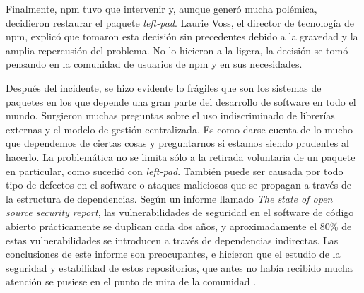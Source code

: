 Finalmente, npm tuvo que intervenir y, aunque generó mucha polémica, decidieron restaurar el paquete \textit{left-pad}. Laurie Voss, 
el director de tecnología de npm, explicó que tomaron esta decisión sin precedentes debido a la gravedad y la amplia repercusión del 
problema. No lo hicieron a la ligera, la decisión se tomó pensando en la comunidad de usuarios de npm y en sus necesidades.


Después del incidente, se hizo evidente lo frágiles que son los sistemas de paquetes en los que depende una gran parte del desarrollo
de software en todo el mundo.
Surgieron muchas preguntas sobre el uso indiscriminado de librerías externas \cite{10.1145/3106237.3106267} y el modelo de gestión centralizada.
Es como darse cuenta de lo mucho que dependemos de ciertas cosas y preguntarnos si estamos siendo prudentes al hacerlo.
La problemática no se limita sólo a la retirada voluntaria de un paquete en particular, como sucedió con \textit{left-pad}.
También puede ser causada por todo tipo de defectos en el software o ataques maliciosos que se propagan a través de la estructura de dependencias.
Según un informe llamado \textit{The state of open source security report}, las vulnerabilidades de seguridad en el software de código abierto
prácticamente se duplican cada dos años, y aproximadamente el 80\% de estas vulnerabilidades se introducen a través de dependencias indirectas.
Las conclusiones de este informe son preocupantes, e hicieron que el estudio de la seguridad y estabilidad de estos repositorios, que antes no había
recibido mucha atención se pusiese en el punto de mira de la comunidad \cite{10.5555/2820518.2820524} \cite{10.1145/3196398.3196401} \cite{BogartChristopherKastner2015}.



